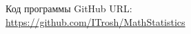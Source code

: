 \documentclass[../main.tex]{subfiles}
\begin{document}
    \noindent Код программы GitHub URL:\\
    \newline \url{https://github.com/ITrosh/MathStatistics}
\end{document}
